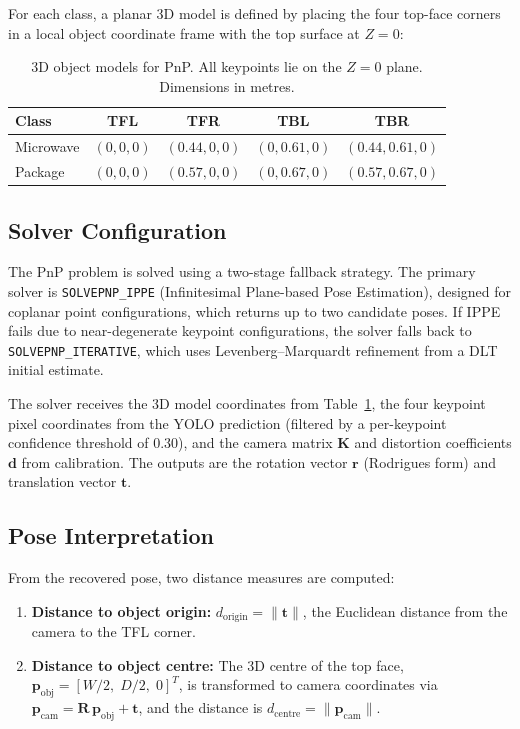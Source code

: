 For each class, a planar 3D model is defined by placing the four top-face corners in a local object coordinate frame with the top surface at $Z = 0$:

\begin{table}[H]
    \centering
    \caption{3D object models for PnP. All keypoints lie on the $Z = 0$ plane. Dimensions in metres.}
    \label{tab:object_models}
    \renewcommand{\arraystretch}{1.2}
    \begin{tabular}{@{}lcccc@{}}
        \toprule
        \textbf{Class} & \textbf{TFL} & \textbf{TFR} & \textbf{TBL} & \textbf{TBR} \\
        \midrule
        Microwave & $(0, 0, 0)$ & $(0.44, 0, 0)$ & $(0, 0.61, 0)$ & $(0.44, 0.61, 0)$ \\
        Package   & $(0, 0, 0)$ & $(0.57, 0, 0)$ & $(0, 0.67, 0)$ & $(0.57, 0.67, 0)$ \\
        \bottomrule
    \end{tabular}
\end{table}

\subsection{Solver Configuration}

The PnP problem is solved using a two-stage fallback strategy. The primary solver is \texttt{SOLVEPNP\_IPPE} (Infinitesimal Plane-based Pose Estimation), designed for coplanar point configurations, which returns up to two candidate poses. If IPPE fails due to near-degenerate keypoint configurations, the solver falls back to \texttt{SOLVEPNP\_ITERATIVE}, which uses Levenberg--Marquardt refinement from a DLT initial estimate.

The solver receives the 3D model coordinates from Table~\ref{tab:object_models}, the four keypoint pixel coordinates from the YOLO prediction (filtered by a per-keypoint confidence threshold of 0.30), and the camera matrix $\mathbf{K}$ and distortion coefficients $\mathbf{d}$ from calibration. The outputs are the rotation vector $\mathbf{r}$ (Rodrigues form) and translation vector $\mathbf{t}$.

\subsection{Pose Interpretation}

From the recovered pose, two distance measures are computed:
\begin{enumerate}
    \item \textbf{Distance to object origin:} $d_{\text{origin}} = \|\mathbf{t}\|$, the Euclidean distance from the camera to the TFL corner.
    \item \textbf{Distance to object centre:} The 3D centre of the top face, $\mathbf{p}_{\text{obj}} = [W/2, \; D/2, \; 0]^T$, is transformed to camera coordinates via $\mathbf{p}_{\text{cam}} = \mathbf{R}\,\mathbf{p}_{\text{obj}} + \mathbf{t}$, and the distance is $d_{\text{centre}} = \|\mathbf{p}_{\text{cam}}\|$.
\end{enumerate}

